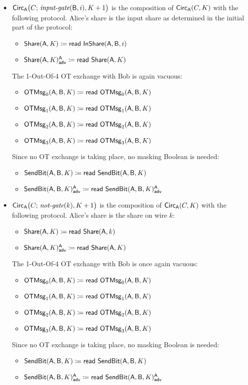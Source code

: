 \begin{itemize}
\item $\Circ_\A\big(C; \, \inputgate(\B,i),K+1\big)$ is the composition of $\Circ_\A(C,K)$ with the following protocol. Alice's share is the input share as determined in the initial part of the protocol:
\begin{itemize}
\item $\Share(\A,K) \coloneqq \read{\InShare(\A,\B,i)}$
\item {\color{blue} $\LeakShare(\A,K)^\A_\adv \coloneqq \read{\Share(\A,K)}$}
\end{itemize}
The 1-Out-Of-4 OT exchange with Bob is again vacuous:
\begin{itemize}
\item $\OTMsg_0(\A,\B,K) \coloneqq \read{\OTMsg_0(\A,\B,K)}$
\item $\OTMsg_1(\A,\B,K) \coloneqq \read{\OTMsg_1(\A,\B,K)}$
\item $\OTMsg_2(\A,\B,K) \coloneqq \read{\OTMsg_2(\A,\B,K)}$
\item $\OTMsg_3(\A,\B,K) \coloneqq \read{\OTMsg_3(\A,\B,K)}$
\end{itemize}
Since no OT exchange is taking place, no masking Boolean is needed:
\begin{itemize}
\item $\SendBit(\A,\B,K) \coloneqq \read{\SendBit(\A,\B,K)}$\item {\color{blue} $\LeakSendBit(\A,\B,K)^\A_\adv \coloneqq \read{\LeakSendBit(\A,\B,K)^\A_\adv}$}
\end{itemize}

\item $\Circ_\A\big(C; \, \notgate(k),K+1\big)$ is the composition of $\Circ_\A(C,K)$ with the following protocol. Alice's share is the share on wire $k$:
\begin{itemize}
\item $\Share(\A,K) \coloneqq \read{\Share(\A,k)}$
\item {\color{blue} $\LeakShare(\A,K)^\A_\adv \coloneqq \read{\Share(\A,K)}$}
\end{itemize}
The 1-Out-Of-4 OT exchange with Bob is once again vacuous:
\begin{itemize}
\item $\OTMsg_0(\A,\B,K) \coloneqq \read{\OTMsg_0(\A,\B,K)}$
\item $\OTMsg_1(\A,\B,K) \coloneqq \read{\OTMsg_1(\A,\B,K)}$
\item $\OTMsg_2(\A,\B,K) \coloneqq \read{\OTMsg_2(\A,\B,K)}$
\item $\OTMsg_3(\A,\B,K) \coloneqq \read{\OTMsg_3(\A,\B,K)}$
\end{itemize}
Since no OT exchange is taking place, no masking Boolean is needed:
\begin{itemize}
\item $\SendBit(\A,\B,K) \coloneqq \read{\SendBit(\A,\B,K)}$
\item {\color{blue} $\LeakSendBit(\A,\B,K)^\A_\adv \coloneqq \read{\LeakSendBit(\A,\B,K)^\A_\adv}$}
\end{itemize}


\end{itemize}
